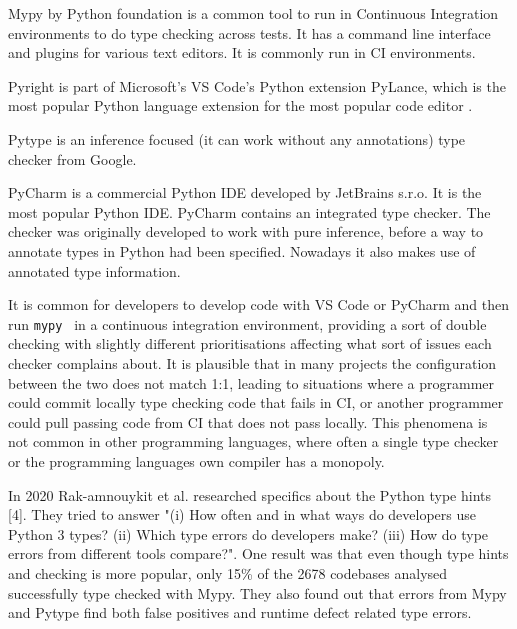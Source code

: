 Mypy by Python foundation is a common tool to run in Continuous Integration environments to do type checking across tests. It has a command line interface and plugins for various text editors. It is commonly run in CI environments\cite{TODO}.

Pyright is part of Microsoft's VS Code's Python extension PyLance, which is the most popular Python language extension for the most popular code editor \cite{TODO}.

Pytype is an inference focused (it can work without any annotations) type checker from Google. 


PyCharm is a commercial Python IDE developed by JetBrains s.r.o. It is the most popular Python IDE. PyCharm contains an integrated type checker. The checker was originally developed to work with pure inference, before a way to annotate types in Python had been specified. Nowadays it also makes use of annotated type information. 


It is common for developers to develop code with VS Code or PyCharm and then run {\tt mypy } in a continuous integration environment, providing a sort of double checking with slightly different prioritisations affecting what sort of issues each checker complains about. It is plausible that in many projects the configuration between the two does not match 1:1, leading to situations where a programmer could commit locally type checking code that fails in CI, or another programmer could pull passing code from CI that does not pass locally. This phenomena is not common in other programming languages, where often a single type checker or the programming languages own compiler has a monopoly.

In 2020 Rak-amnouykit et al. researched specifics about the Python type hints [4]. They tried to answer "(i) How often and in what ways do developers use Python 3 types? (ii) Which type errors do developers make? (iii) How do type errors from different tools compare?".  One result was that even though type hints and checking is more popular, only 15\% of the 2678 codebases analysed successfully type checked with Mypy. They also found out that errors from Mypy and Pytype find both false positives and runtime defect related type errors.
